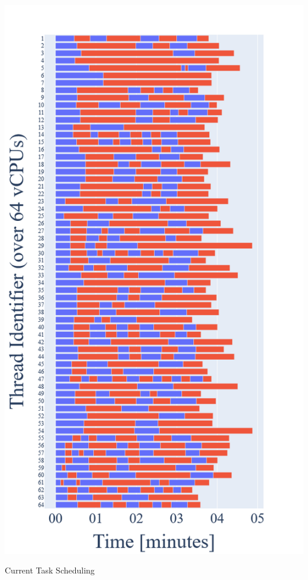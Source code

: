 \begin{marginfigure}[*13]
  \centering
  \includegraphics[width=\textwidth]{figures/new}
  \caption{Current Task Scheduling}
\end{marginfigure}


